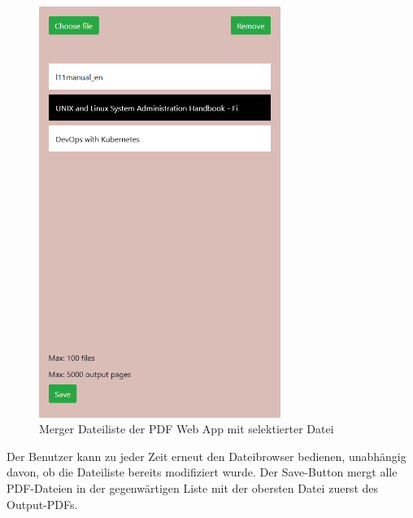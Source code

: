 \begin{figure}[!htbp]
	\centering
	\includegraphics[width=0.7\textwidth]{"images/mergelist.png"}
	\caption{Merger Dateiliste der PDF Web App mit selektierter Datei}
	\label{fig:mergelist}
\end{figure}

Der Benutzer kann zu jeder Zeit erneut den Dateibrowser bedienen, unabhängig davon, ob die Dateiliste bereits modifiziert wurde. Der Save-Button mergt alle PDF-Dateien in der gegenwärtigen Liste mit der obersten Datei zuerst des Output-PDFs.


